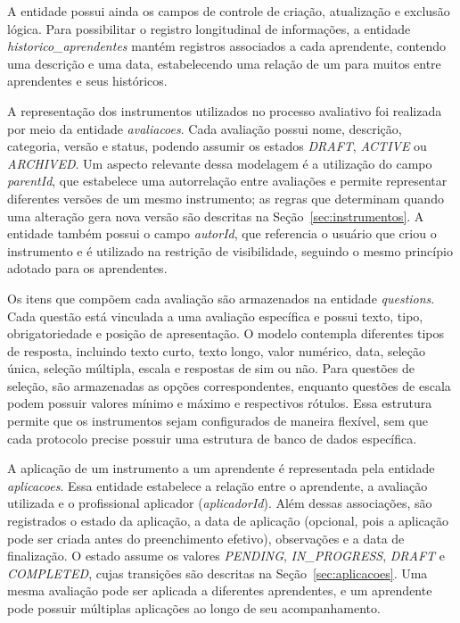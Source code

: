 A entidade possui ainda os campos de controle de criação, atualização e exclusão lógica. Para possibilitar o registro longitudinal de informações, a entidade \textit{historico\_aprendentes} mantém registros associados a cada aprendente, contendo uma descrição e uma data, estabelecendo uma relação de um para muitos entre aprendentes e seus históricos.

A representação dos instrumentos utilizados no processo avaliativo foi realizada por meio da entidade \textit{avaliacoes}. Cada avaliação possui nome, descrição, categoria, versão e status, podendo assumir os estados \textit{DRAFT}, \textit{ACTIVE} ou \textit{ARCHIVED}. Um aspecto relevante dessa modelagem é a utilização do campo \textit{parentId}, que estabelece uma autorrelação entre avaliações e permite representar diferentes versões de um mesmo instrumento; as regras que determinam quando uma alteração gera nova versão são descritas na Seção~\ref{sec:instrumentos}. A entidade também possui o campo \textit{autorId}, que referencia o usuário que criou o instrumento e é utilizado na restrição de visibilidade, seguindo o mesmo princípio adotado para os aprendentes.

Os itens que compõem cada avaliação são armazenados na entidade \textit{questions}. Cada questão está vinculada a uma avaliação específica e possui texto, tipo, obrigatoriedade e posição de apresentação. O modelo contempla diferentes tipos de resposta, incluindo texto curto, texto longo, valor numérico, data, seleção única, seleção múltipla, escala e respostas de sim ou não. Para questões de seleção, são armazenadas as opções correspondentes, enquanto questões de escala podem possuir valores mínimo e máximo e respectivos rótulos. Essa estrutura permite que os instrumentos sejam configurados de maneira flexível, sem que cada protocolo precise possuir uma estrutura de banco de dados específica.

A aplicação de um instrumento a um aprendente é representada pela entidade \textit{aplicacoes}. Essa entidade estabelece a relação entre o aprendente, a avaliação utilizada e o profissional aplicador (\textit{aplicadorId}). Além dessas associações, são registrados o estado da aplicação, a data de aplicação (opcional, pois a aplicação pode ser criada antes do preenchimento efetivo), observações e a data de finalização. O estado assume os valores \textit{PENDING}, \textit{IN\_PROGRESS}, \textit{DRAFT} e \textit{COMPLETED}, cujas transições são descritas na Seção~\ref{sec:aplicacoes}. Uma mesma avaliação pode ser aplicada a diferentes aprendentes, e um aprendente pode possuir múltiplas aplicações ao longo de seu acompanhamento.

